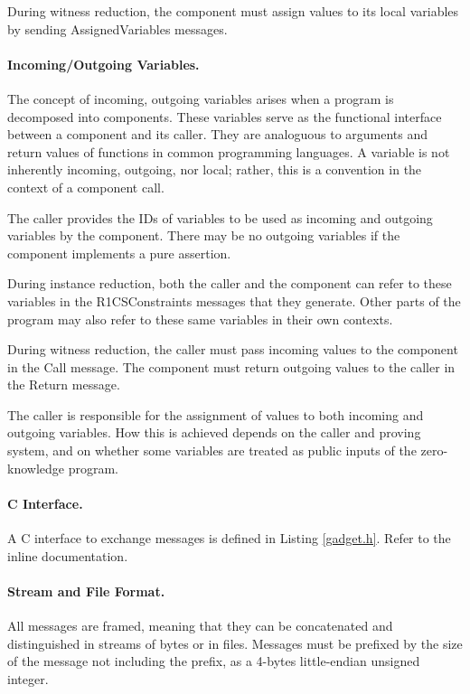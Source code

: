 	During witness reduction, the component must assign values to its local variables
	by sending AssignedVariables messages.

\paragraph{Incoming/Outgoing Variables.}

	The concept of incoming, outgoing variables arises when a program is decomposed into components.
	These variables serve as the functional interface between a component and its caller.
	They are analoguous to arguments and return values of functions in common programming languages.
	A variable is not inherently incoming, outgoing, nor local;
	rather, this is a convention in the context of a component call.

	The caller provides the IDs of variables to be used as incoming and outgoing variables by the component.
	There may be no outgoing variables if the component implements a pure assertion.

	During instance reduction, both the caller and the component can refer to
	these variables in the R1CSConstraints messages that they generate.
	Other parts of the program may also refer to these same variables in their own contexts.

	During witness reduction, the caller must pass incoming values to the component in the Call message.
	The component must return outgoing values to the caller in the Return message.

	The caller is responsible for the assignment of values to both incoming and outgoing variables.
	How this is achieved depends on the caller and proving system,
	and on whether some variables are treated as public inputs of the zero-knowledge program.

\paragraph{C Interface.}

	A C interface to exchange messages is defined in Listing \ref{gadget.h}.
	Refer to the inline documentation.

\paragraph{Stream and File Format.}
	All messages are framed, meaning that they can be concatenated and distinguished in streams of bytes or in files.
	Messages must be prefixed by the size of the message not including the prefix,
	as a 4-bytes little-endian unsigned integer.
